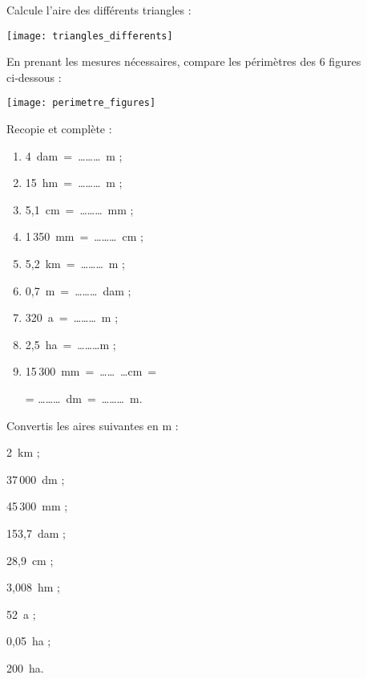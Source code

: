 \begin{exercice}
Calcule l'aire des différents triangles :

\begin{center} \texttt{[image: triangles\_differents]} \end{center}
\end{exercice}


\begin{exercice}
En prenant les mesures nécessaires, compare les périmètres des 6 figures ci‑dessous :

\begin{center} \texttt{[image: perimetre\_figures]} \end{center}
\end{exercice}


\begin{exercice}
Recopie et complète :
\begin{enumerate}
 \item 4 dam = \ldots \ldots \ldots m ;
 \item 15 hm = \ldots \ldots \ldots m ;
 \item 5,1 cm = \ldots \ldots \ldots mm ;
 \item 1\,350 mm = \ldots \ldots \ldots cm ;
 \item 5,2 km = \ldots \ldots \ldots m ;
 \item 0,7 m = \ldots \ldots \ldots dam ;
 \item 320 a = \ldots \ldots \ldots m ;
 \item 2,5 ha = \ldots \ldots \ldots m ;
 \item 15\,300 mm = \ldots \ldots \ldots cm = 
 
 = \ldots \ldots  \ldots dm = \ldots \ldots \ldots m.
 \end{enumerate}
\end{exercice}


\begin{exercice}
Convertis les aires suivantes en m :
\begin{colenumerate}{3}
 \item 2 km ;
 \item 37\,000 dm ;
 \item 45\,300 mm ;
 \item 153,7 dam ;
 \item 28,9 cm ;
 \item 3,008 hm ;
 \item 52 a ;
 \item 0,05 ha ;
 \item 200 ha.
 \end{colenumerate}
\end{exercice}


